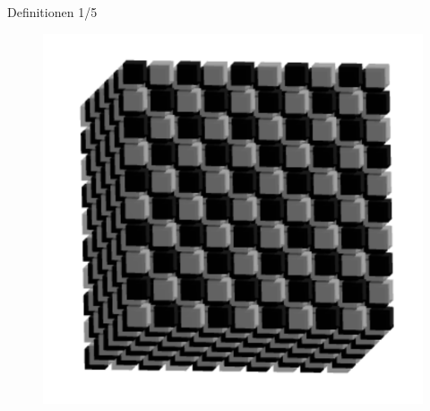 \documentclass[aspectratio=169]{beamer}
\begin{document}
\begin{frame}{Definitionen 1/5}
\begin{multicols*}{3}
      \begin{figure}[H]
          \centering
          \includegraphics[width = 0.35 \textheight]{3d_cellspace.png}
      \end{figure}


    \end{multicols*}

  \end{frame}
\end{document}
